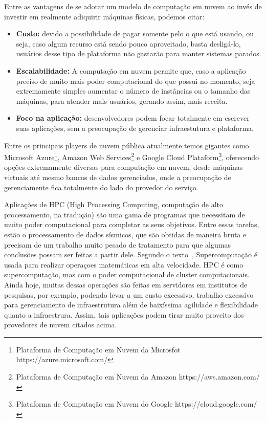 \documentclass[11pt,twoside]{article}
\begin{document}
Entre as vantagens de se adotar um modelo de computação em nuvem ao invés de investir em realmente adiquirir máquinas físicas, podemos citar:

\begin{itemize}
  \item \textbf{Custo:} devido a possibilidade de pagar somente pelo o que está usando, ou seja, caso algum recurso está sendo pouco aproveitado, basta desligá-lo, usuários desse tipo de 
  plataforma não gastarão para manter sistemas parados.
  \item \textbf{Escalabilidade:} A computação em nuvem permite que, caso a aplicação preciso de muito mais poder computacional do que possui no momento, seja extremamente simples aumentar
  o número de instâncias ou o tamanho das máquinas, para atender mais usuários, gerando assim, mais receita.
  \item \textbf{Foco na aplicação:} desenvolvedores podem focar totalmente em escrever suas aplicações, sem a preocupação de gerenciar infraestutura e plataforma.

\end{itemize}

Entre os principais players de nuvem pública atualmente temos gigantes como Microsoft Azure\footnote{Plataforma de Computação em Nuvem da Microsfot https://azure.microsoft.com/}, 
Amazon Web Services\footnote{Plataforma de Computação em Nuvem da Amazon https://aws.amazon.com/} e Google Cloud Plataform\footnote{Plataforma de Computação em Nuvem do Google https://cloud.google.com/}, 
oferecendo opções extremamente diversas para computação em nuvem, desde máquinas virtuais até mesmo bancos de dados gerenciados, onde a preocupação de gerenciamente fica totalmente
do lado do provedor do serviço.

Aplicações de HPC (High Processing Computing, computação de alto processamento, na tradução) são uma gama de programas que necessitam de muito poder computacional para 
completar as seus objetivos. Entre essas tarefas, estão o processamento de dados sísmicos, que são obtidas de maneira bruta e precisam de um trabalho muito pesado de tratamento
para que algumas conclusões possam ser feitas a partir dele. Segundo o texto~\cite{HPC}, Supercomputação é usada para realizar operaçoes matemáticas em alta velocidade. HPC é como supercomputação,
mas com o poder computacional de cluster computacionais.
Ainda hoje, muitas dessas operações são feitas em servidores em institutos de pesquisas, por exemplo, podendo levar
a um custo excessivo, trabalho excessivo para gerenciamento de infraestrutura além de baixíssima agilidade e flexibilidade quanto a infraestrura. Assim, tais aplicações podem 
tirar muito proveito dos provedores de nuvem citados acima.
\end{document}
